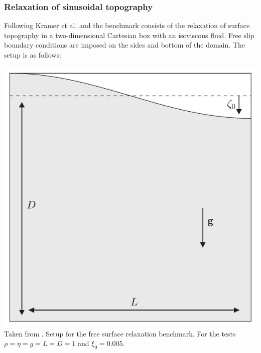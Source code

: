 
\subsubsection{Relaxation of sinusoidal topography}

Following Kramer et al. \cite[Section 3.1.1]{krwd12} and \cite{robh17} 
the benchmark consists of the relaxation of surface topography in a 
two-dimensional Cartesian box with an isoviscous fluid. 
Free slip boundary conditions are imposed on the sides and bottom of the domain.
The setup is as follows:

\begin{center}
\begin{minipage}{0.45\textwidth}
\centering
\includegraphics[height=0.8\textwidth]{images/benchmark_relaxation/robh17}\\
{\small Taken from \cite{robh17}. Setup for the free surface relaxation benchmark.
For the tests $\rho=\eta=g=L=D=1$ and $\xi_0=0.005$.}
\end{minipage}\hfill
\begin{minipage}{0.45\textwidth}
\centering

\end{minipage}
\end{center}
